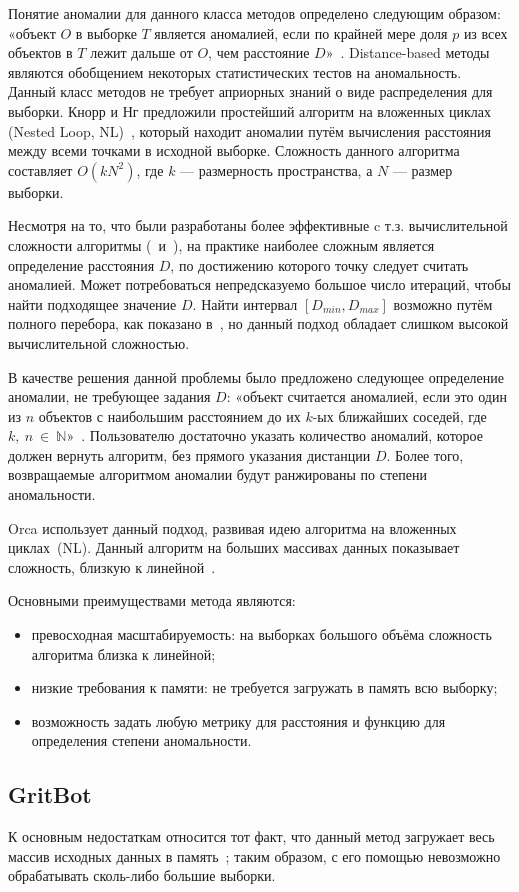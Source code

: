 Понятие аномалии для данного класса методов определено следующим образом: «объект $O$ в выборке $T$ является аномалией, если по крайней мере доля $p$ из всех объектов в $T$ лежит дальше от $O$, чем расстояние $D$»~\cite{KnorrNgDistBasedAlgorithms}. Distance-based методы являются обобщением некоторых статистических тестов на аномальность. Данный класс методов не требует априорных знаний о виде распределения для выборки. Кнорр и Нг предложили простейший алгоритм на вложенных циклах (Nested Loop, NL)~\cite{KnorrNgDistBasedAlgorithms}, который находит аномалии путём вычисления расстояния между всеми точками в исходной выборке. Сложность данного алгоритма составляет $O(kN^2)$, где $k$ --- размерность пространства, а $N$ --- размер выборки.

Несмотря на то, что были разработаны более эффективные c т.з. вычислительной сложности алгоритмы (\cite{TaoMiningDistBasedOutliersFromLargeDB}~и~\cite{AngiulliVeryEfficientMiningDistBasedOutliers}), на практике наиболее сложным является определение расстояния $D$, по достижению которого точку следует считать аномалией. Может потребоваться непредсказуемо большое число итераций, чтобы найти подходящее значение $D$. Найти интервал $[D_{min}, D_{max}]$ возможно путём полного перебора, как показано в~\cite{TaoMiningDistBasedOutliersFromLargeDB}, но данный подход обладает слишком высокой вычислительной сложностью.

В качестве решения данной проблемы было предложено следующее определение аномалии, не требующее задания $D$: «объект считается аномалией, если это один из $n$ объектов с наибольшим расстоянием до их $k$-ых ближайших соседей, где~$k,~n~\in~\mathbb{N}$»~\cite{RamaswamyEffAlgoMiningOutliers}. Пользователю достаточно указать количество аномалий, которое должен вернуть алгоритм, без прямого указания дистанции $D$. Более того, возвращаемые алгоритмом аномалии будут ранжированы по степени аномальности.

Orca использует данный подход, развивая идею алгоритма на вложенных циклах~(NL). Данный алгоритм на больших массивах данных показывает сложность, близкую к линейной~\cite{BaySchwabacherOrca}.



Основными преимуществами метода являются:
\begin{itemize}
	\item превосходная масштабируемость: на выборках большого объёма сложность алгоритма близка к линейной;
	\item низкие требования к памяти: не требуется загружать в память всю выборку;
	\item возможность задать любую метрику для расстояния и функцию для определения степени аномальности.
\end{itemize}

\subsection{GritBot}
К основным недостаткам относится тот факт, что данный метод загружает весь массив исходных данных в память~\cite{BaySchwabacherOrca}; таким образом, с его помощью невозможно обрабатывать сколь-либо большие выборки.